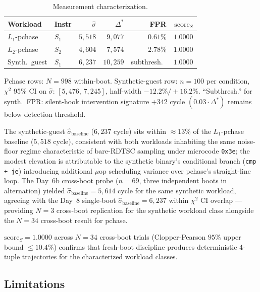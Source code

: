 \documentclass[conference]{IEEEtran}
\newcommand{\sigbase}{\hat{\sigma}_\text{baseline}}
\newcommand{\Dstar}{\Delta^{*}}
\newcommand{\scoreS}{\text{score}_S}
\begin{document}
\begin{table}[t]
  \caption{Measurement characterization.}
  \label{tab:meas}
  \centering
  \small
  \begin{tabular}{@{}llrrrr@{}}
  \toprule
  Workload      & Instr & $\hat{\sigma}$ & $\Dstar$    & FPR     & $\scoreS$ \\
  \midrule
  $L_1$-pchase  & $S_1$ & $5{,}518$      & $9{,}077$   & $0.61\%$ & $1.0000$ \\
  $L_2$-pchase  & $S_2$ & $4{,}604$      & $7{,}574$   & $2.78\%$ & $1.0000$ \\
  Synth.\ guest & $S_1$ & $6{,}237$      & $10{,}259$  & subthresh.\ & $1.0000$ \\
  \bottomrule
  \end{tabular}

  \vspace{0.3em}
  \footnotesize{Pchase rows: $N{=}998$ within-boot. Synthetic-guest
  row: $n{=}100$ per condition, $\chi^2$ 95\% CI on $\hat{\sigma}$:
  $[5{,}476,\,7{,}245]$, half-width $-12.2\%/+16.2\%$. ``Subthresh.''
  for synth.\ FPR: silent-hook intervention signature $+342$ cycle
  $(0.03\cdot\Dstar)$ remains below detection threshold.}
\end{table}

The synthetic-guest $\sigbase$ ($6{,}237$ cycle) sits within
${\approx}13\%$ of the $L_1$-pchase baseline ($5{,}518$ cycle),
consistent with both workloads inhabiting the same noise-floor
regime characteristic of bare-RDTSC sampling under microcode
\texttt{0x3e}; the modest elevation is attributable to the synthetic
binary's conditional branch (\texttt{cmp + je}) introducing
additional $\mu$op scheduling variance over pchase's straight-line
loop. The Day~6b cross-boot probe ($n{=}69$, three independent boots
in alternation) yielded $\sigbase = 5{,}614$ cycle for the same
synthetic workload, agreeing with the Day~8 single-boot
$\sigbase = 6{,}237$ within $\chi^2$ CI overlap --- providing $N{=}3$
cross-boot replication for the synthetic workload class alongside
the $N{=}34$ cross-boot result for pchase.

$\scoreS = 1.0000$ across $N{=}34$ cross-boot trials (Clopper-Pearson
$95\%$ upper bound $\leq 10.4\%$) confirms that fresh-boot discipline
produces deterministic 4-tuple trajectories for the characterized
workload classes.

\subsection{Limitations}\label{sec:eval-lim}
\end{document}
